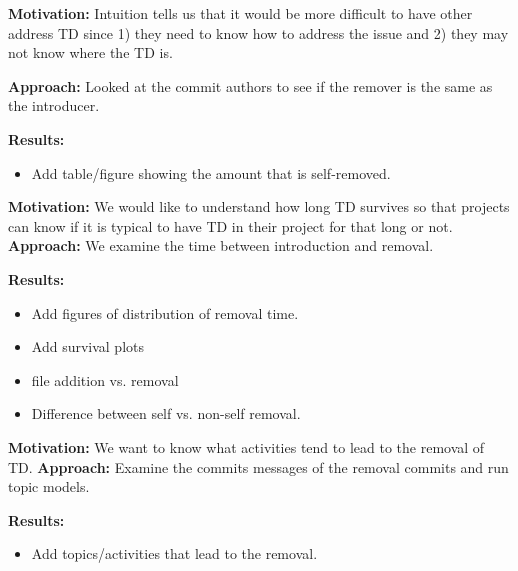 \noindent \textbf{Motivation:} 
Intuition tells us that it would be more difficult to have other address TD since 1) they need to know how to address the issue and 2) they may not know where the TD is.

\vspace{1mm}
\noindent \textbf{Approach:} 
Looked at the commit authors to see if the remover is the same as the introducer.

\vspace{1mm}
\noindent \textbf{Results:} 
\begin{itemize}
\item Add table/figure showing the amount that is self-removed.
\end{itemize}



\vspace{3mm}
\noindent\rqiii
\vspace{3mm}

\noindent \textbf{Motivation:} 
We would like to understand how long TD survives so that projects can know if it is typical to have TD in their project for that long or not.
\vspace{1mm}
\noindent \textbf{Approach:} 
We examine the time between introduction and removal.

\vspace{1mm}
\noindent \textbf{Results:} 
\begin{itemize}
\item Add figures of distribution of removal time.
\item Add survival plots
\item file addition vs. removal
\item Difference between self vs. non-self removal.
\end{itemize}


 \vspace{3mm}
 \noindent\rqiv
 \vspace{3mm}

 \noindent \textbf{Motivation:} 
We want to know what activities tend to lead to the removal of TD.
 \vspace{1mm}
 \noindent \textbf{Approach:} 
Examine the commits messages of the removal commits and run topic models.
 \vspace{1mm}
 
 \noindent \textbf{Results:} 
\begin{itemize}
\item Add topics/activities that lead to the removal.
\end{itemize}
 \conclusionbox{}